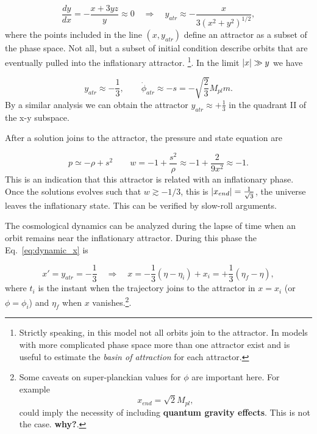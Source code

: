\documentclass[12pt,letterpaper,twoside]{book}
\DeclarePairedDelimiter\abs{\lvert}{\rvert}%
\begin{document}
\begin{equation}
    \frac{dy}{dx}= -\frac{x + 3yz}{y} \approx 0  \quad \Rightarrow
    \quad  y_{atr}  \approx  - \frac{x}{3 \left(x^2 + y^2\right)^{1/2}},
\end{equation}
where the points included in the line $(x,y_{atr})$ define an attractor as a
subset of the phase space.  Not all, but a subset of initial condition describe
orbits that are  eventually pulled into the inflationary attractor.
\footnote{Strictly speaking, in this model not
    all orbits join to the attractor. In models with more complicated phase space
    more than one attractor exist and is useful to estimate the \textit{basin of
        attraction} for each attractor.}. In the limit $\abs{x} \gg y$ we have

\begin{equation}
    \boxed{y_{atr} \approx -\frac{1}{3},}  \qquad
    \boxed{\dot{\phi}_{atr} \approx -s = -\sqrt{\frac{2}{3}} M_{pl} m.}
\end{equation}
By a similar analysis we can obtain the attractor $y_{atr} \approx +\frac{1}{3}$
in the quadrant II of the x-y subspace.

After a solution joins to the attractor, the pressure
and state equation are

\begin{equation}
   p \simeq -\rho + s^2 \qquad w = -1 + \frac{s^2}{\rho}
                           \approx -1 + \frac{2}{9x^2}
                           \approx -1.
\end{equation}
This is an indication that this attractor is related with an inflationary phase.
Once the solutions evolves such that $w\gtrsim -1/3$, this is
$\abs{x_{end}}=\frac{1}{\sqrt{3}}$, the universe leaves the inflationary state.
This can be verified by slow-roll arguments.

The cosmological dynamics can be analyzed during the lapse of time when an orbit
remains near the inflationary attractor. During this phase the
Eq.~\eqref{eq:dynamic_x} is

\begin{equation}
x'= y_{atr}= -\frac{1}{3}  \quad \Rightarrow
                           \quad x = - \frac{1}{3} \left(\eta- \eta_i\right) + x_i
                                   = + \frac{1}{3} \left(\eta_f- \eta\right),
\end{equation}
where $t_i$ is the instant when the trajectory joins to the attractor in $x=x_i$ (or
$\phi=\phi_i$) and $\eta_f$ when $x$ vanishes.\footnote{Some caveats on
    super-planckian values for $\phi$ are important here. For example \[
        x_{end}= \sqrt{2} M_{pl}, \] could imply the necessity of including
    \textbf{quantum gravity effects}. This is not the case. \textbf{why?}. }.
\end{document}
